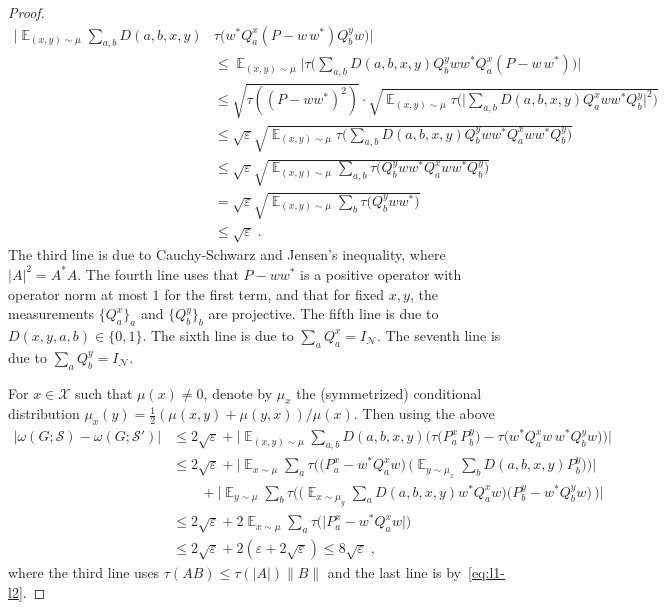\documentclass[11pt]{article}
\theoremstyle{definition}
\newcommand{\strategy}{\mathscr{S}}
\DeclareMathOperator*{\Expectation}{\mathbb{E}}
\newcommand{\Es}[1]{\Expectation_{#1}}
\newcommand{\mX}{\ensuremath{\mathcal{X}}}
\newcommand{\eps}{\varepsilon}
\newcommand{\mN}{\mathcal{N}}
\begin{document}
\begin{proof}
\begin{align*}
\Big|\Es{(x,y)\sim\mu} \sum_{a,b} D(a,b,x,y) & \tau\big( w^* Q^x_a (P - w\, w^* ) Q^y_b w\big)\Big|\\
&\leq \Es{(x,y)\sim\mu} \Big | \tau\big( \sum_{a,b} D(a,b,x,y)   Q^y_b w w^* Q^x_a (P - w\, w^* ) \big) \Big | \\
&\leq \sqrt{ \tau((P - ww^*)^2)} \cdot \sqrt{\Es{(x,y)\sim\mu} \tau\big( \big| \sum_{a,b} D(a,b,x,y)   Q^x_a w w^* Q^y_b \big|^2 \big) } \\
&\leq \sqrt{\eps}\sqrt{ \Es{(x,y)\sim\mu} \tau\big( \sum_{a,b} D(a,b,x,y)   Q^y_b ww^* Q^x_a w w^* Q^y_b \big) } \\
&\leq \sqrt{\eps}\sqrt{ \Es{(x,y)\sim\mu}  \sum_{a,b}  \tau\big(Q^y_b ww^* Q^x_a w w^* Q^y_b \big) }  \\
&=\sqrt{\eps}\sqrt{ \Es{(x,y)\sim\mu}  \sum_{b}  \tau\big(Q^y_b ww^* \big) } \\
&\leq \sqrt{\eps}\;.
\end{align*}
The third line is due to Cauchy-Schwarz and Jensen's inequality, where $|A|^2=A^*A$. The fourth line uses that $P - ww^*$ is a positive operator with operator norm at most $1$ for the first term, and that for fixed $x,y$, the measurements $\{ Q^x_a \}_a$ and $\{Q^y_b\}_b$ are projective. The fifth line is due to $D(x,y,a,b) \in \{0,1\}$. The sixth line is due to $\sum_a Q^x_a = I_\mN$. The seventh line is due to $\sum_a Q^y_b = I_\mN$.

For $x\in \mX$ such that $\mu(x)\neq 0$, denote by $\mu_x$ the (symmetrized) conditional distribution $\mu_x(y)=\frac{1}{2}(\mu(x,y)+\mu(y,x))/\mu(x)$. Then using the above
\begin{align*}
\big|\omega(G;\strategy) - \omega(G;\strategy')\big|
 &\leq 2\sqrt{\eps}+ \Big|\Es{(x,y)\sim\mu} \sum_{a,b} D(a,b,x,y) \big( \tau\big( P^x_a \, P^y_b \big)-\tau\big( w^* Q^x_a w\, w^* Q^y_b w\big)\big)\Big|\\
&\leq  2\sqrt{\eps}+ \Big|\Es{x\sim\mu} \sum_{a}  \tau\Big( \big(P^x_a-w^* Q^x_aw\big) \, \Big( \Es{y\sim \mu_x} \sum_b D(a,b,x,y) P^y_b \Big)\Big)\Big|\\
&\qquad+ \Big|\Es{y\sim\mu} \sum_{b}  \tau\Big(\Big( \Es{x\sim \mu_y} \sum_a D(a,b,x,y) w^* Q^x_a w\Big) \big(P^y_b-w^*Q^y_bw\big) \, \Big)\Big|\\
&\leq 2\sqrt{\eps}+2\Es{x\sim\mu} \sum_{a}  \tau\big(\big| P^x_a-w^*Q^x_aw\big|\big) \\
&\leq 2\sqrt{\eps}+2(\eps + 2\sqrt{\eps}) \leq 8\sqrt{\eps}\;,
\end{align*}
where the third line uses $\tau(AB)\leq\tau(|A|)\|B\|$ and the last line is by~\eqref{eq:l1-l2}.%
\end{proof}
\end{document}
